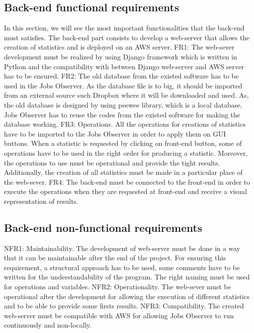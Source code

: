 \documentclass[conference,compsoc]{IEEEtran}
\begin{document}
\subsection{Back-end functional requirements}
In this section, we will see the most important functionalities that the back-end must satisfies. The back-end part consists to develop a web-server that allows the creation of statistics and is deployed on an AWS server. 
\newline\newline
FR1: The web-sever development must be realized by using Django framework which is written in Python and the compatibility with between Django web-server and AWS server has to be ensured. 
\newline\newline
FR2: The old database from the existed software has to be used in the Jobs Observer. As the database file is to big, it should be imported from an external source such Dropbox where it will be downloaded and used. As, the old database is designed by using peewee library, which is a local database, Jobs Observer has to reuse the codes from the existed software for making the database working. 
\newline\newline
FR3: Operations. All the operations for creations of statistics have to be imported to the Jobs Observer in order to apply them on GUI buttons. When a statistic is requested by clicking on front-end button, some of operations have to be used in the right order for producing a statistic. Moreover, the operations to use must be operational and provide the tight results. Additionally, the creation of all statistics must be made in a particular place of the web-sever. 
\newline\newline
FR4: The back-end must be connected to the front-end in order to execute the operations when they are requested at front-end and receive a visual representation of results. 
\subsection{Back-end non-functional requirements}
NFR1: Maintainability. The development of web-server must be done in a way that it can be maintainable after the end of the project. For ensuring this requirement, a structural approach has to be used, some comments have to be written for the understandability of the program. The right naming must be used for operations and variables. 
\newline\newline
NFR2: Operationality. The web-sever must be operational after the development for allowing the execution of different statistics and to be able to provide some firsts results. 
\newline\newline
NFR3: Compatibility. The created web-server must be compatible with AWS for allowing Jobs Observer to run continuously and non-locally. 
\end{document}
